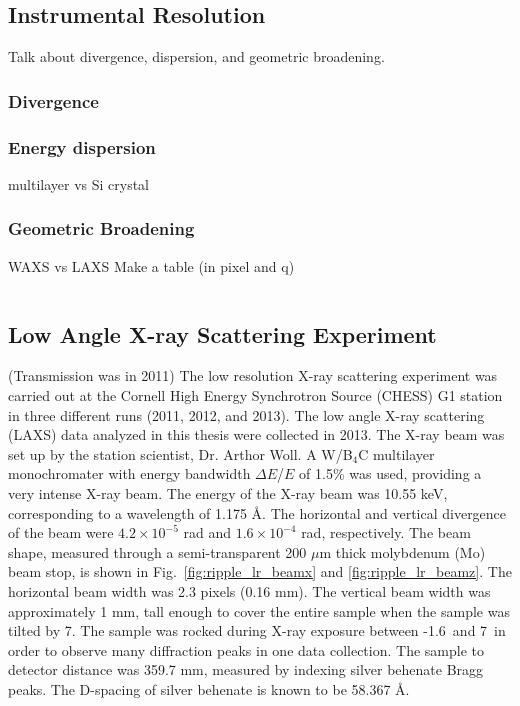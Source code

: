 \subsection{Instrumental Resolution}
Talk about divergence, dispersion, and geometric broadening.
\subsubsection{Divergence}

\subsubsection{Energy dispersion}
multilayer vs Si crystal

\subsubsection{Geometric Broadening}
WAXS vs LAXS
Make a table (in pixel and q)

\begin{table}[htbp]
  \centering
  \begin{tabular}{ccc}
    \hline
    
  \end{tabular}
\end{table}

\subsection{Low Angle X-ray Scattering Experiment}\label{sec:LAXS_method}
(Transmission was in 2011)
The low resolution X-ray scattering experiment was carried out at the Cornell 
High Energy Synchrotron Source (CHESS) G1 station in three different runs
(2011, 2012, and 2013). The low angle X-ray scattering (LAXS) data analyzed 
in this thesis were collected in 2013.
The X-ray beam was set up by the station scientist, Dr. Arthor Woll.
A W/B$_4$C multilayer monochromater with energy bandwidth $\Delta E$/$E$ of 1.5\% was used,
providing a very intense X-ray beam. 
The energy of the X-ray beam was 10.55 keV, corresponding to a wavelength 
of 1.175 \AA. 
The horizontal and vertical divergence of the beam were
$4.2 \times 10^{-5}$ rad and $1.6 \times 10^{-4}$ rad, respectively.
The beam shape, measured through a semi-transparent 200 $\mu$m thick
molybdenum (Mo) beam stop, is shown in Fig.~\ref{fig:ripple_lr_beamx}
and \ref{fig:ripple_lr_beamz}.
The horizontal beam width was 2.3 pixels (0.16 mm). The vertical beam
width was approximately 1 mm, tall enough to cover the entire sample
when the sample was tilted by 7\textdegree. The sample was rocked
during X-ray exposure between -1.6\textdegree\ and 7\textdegree\ 
in order to observe many diffraction peaks in one data collection. 
The sample to detector distance was 359.7 mm, measured by indexing
silver behenate Bragg peaks. The D-spacing of silver behenate is known to be
58.367 \AA.

